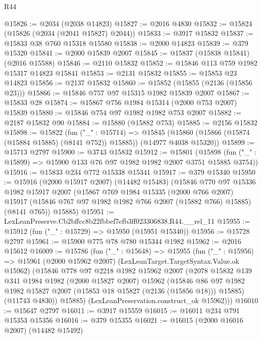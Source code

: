 \begin{lexlean}{R44}
\begin{coremodule}
@15826 := @2034 (@2038 @14823)
@15827 := @2016 @4830
@15832 := @15824 (@15826 (@2034 (@2041 @15827) @2044))
@15833 := @3917 @15832
@15837 := @15833 @38 @760 @15318 @15580
@15838 := @2000 @14823
@15839 := @379 @15320
@15841 := @2000 @15839 @2007
@15845 := @15837 (@15838 @15841) (@2016 @15588)
@15846 := @2110 @15832
@15852 := @15846 @113 @759 @1982 @15317 @14823 @15841
@15853 := @2131 @15832
@15855 := @15853 @23 @14823
@15856 := @2137 @15832
@15860 := @15852 (@15855 (@2136 (@15856 @23)))
@15866 := @15846 @757 @97 @15315 @1982 @15839 @2007
@15867 := @15833 @28
@15874 := @15867 @756 @1984 @15314 (@2000 @753 @2007) @15839
@15880 := @15846 @754 @97 @1982 @1982 @753 @2007
@15882 := @2187 @15832 @90
@15884 := @15880 (@15882 @753)
@15885 := @2156 @15832
@15898 := @15822
    (fun ("_" : @15714) =>
    @15845 (@15860 (@15866 (@15874 (@15884 @15885) (@8141 @752)) @15885)) (@14977 @4038 @15320))
@15899 := @15713 @2797
@15900 := @3743 @15832
@15912 := @15801
    (@15898 (fun ("_" : @15899) => @15900 @133 @76 @97 @1982 @1982 @2007 @3751 @15885 @3754))
@15916 := @15833 @234 @772 @15338 @15341
@15917 := @379 @15340
@15950 := @15916
    (@2000 @15917 @2007)
    (@14482 @15483)
    (@15846
      @770
      @97
      @15336
      @1982
      @15917
      @2007
      (@15867
        @769
        @1984
        @15335
        (@2000 @766 @2007)
        @15917
        (@15846 @767 @97 @1982 @1982 @766 @2007 (@15882 @766) @15885)
        (@8141 @765))
      @15885)
@15951 := LexLeanPreserve.Cb2bffcc8b22fbbef7efb3ff023306838.R44.__rel_11
@15955 := @15912 (fun ("_" : @15729) => @15950 (@15951 @15340))
@15956 := @15728 @2797
@15961 := @15900 @775 @78 @780 @15344 @1982
@15962 := @2016 @15612
@16009 := @15786
    (fun ("_" : @15648) =>
    @15955
      (fun ("_" : @15956) =>
      @15961
        (@2000 @15962 @2007)
        (LexLeanTarget.TargetSyntax.Value.ok @15962)
        (@15846
          @778
          @97
          @2218
          @1982
          @15962
          @2007
          (@2078
            @15832
            @139
            @341
            @1984
            @1982
            (@2000 @15827 @2007)
            @15962
            (@15846
              @86
              @97
              @1982
              @1982
              @15827
              @2007
              (@15853 @18 @15827 (@2136 (@15856 @18)))
              @15885)
            (@11743 @4830))
          @15885)
        (LexLeanPreservation.construct_ok @15962)))
@16010 := @15647 @2797
@16011 := @3917 @15559
@16015 := @16011 @234 @791 @15353 @15356
@16016 := @379 @15355
@16021 := @16015 (@2000 @16016 @2007) (@14482 @15492)

\end{coremodule}
\end{lexlean}
